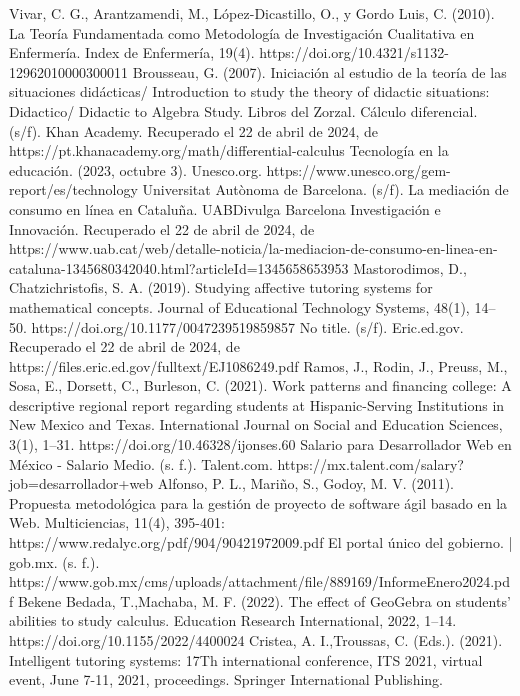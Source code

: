 \documentclass{article}
\begin{document}
\newpage
\begin{thebibliography}{99}
   Vivar, C. G., Arantzamendi, M., López-Dicastillo, O., y Gordo Luis, C. (2010). La Teoría Fundamentada como Metodología de Investigación Cualitativa en Enfermería. Index de Enfermería, 19(4). https://doi.org/10.4321/s1132-12962010000300011
   Brousseau, G. (2007). Iniciación al estudio de la teoría de las situaciones didácticas/ Introduction to study the theory of didactic situations: Didactico/ Didactic to Algebra Study. Libros del Zorzal.
  Cálculo diferencial. (s/f). Khan Academy. Recuperado el 22 de abril de 2024, de https://pt.khanacademy.org/math/differential-calculus
   Tecnología en la educación. (2023, octubre 3). Unesco.org. https://www.unesco.org/gem-report/es/technology
   Universitat Autònoma de Barcelona. (s/f). La mediación de consumo en línea en Cataluña. UABDivulga Barcelona Investigación e Innovación. Recuperado el 22 de abril de 2024, de https://www.uab.cat/web/detalle-noticia/la-mediacion-de-consumo-en-linea-en-cataluna-1345680342040.html?articleId=1345658653953
   Mastorodimos, D., Chatzichristofis, S. A. (2019). Studying affective tutoring systems for mathematical concepts. Journal of Educational Technology Systems, 48(1), 14–50. https://doi.org/10.1177/0047239519859857
   No title. (s/f). Eric.ed.gov. Recuperado el 22 de abril de 2024, de https://files.eric.ed.gov/fulltext/EJ1086249.pdf
   Ramos, J., Rodin, J., Preuss, M., Sosa, E., Dorsett, C., Burleson, C. (2021). Work patterns and financing college: A descriptive regional report regarding students at Hispanic-Serving Institutions in New Mexico and Texas. International Journal on Social and Education Sciences, 3(1), 1–31. https://doi.org/10.46328/ijonses.60
  Salario para Desarrollador Web en México - Salario Medio. (s. f.). Talent.com. https://mx.talent.com/salary?job=desarrollador+web
  Alfonso, P. L., Mariño, S., Godoy, M. V. (2011). Propuesta metodológica para la gestión de proyecto de software ágil basado en la Web. Multiciencias, 11(4), 395-401: https://www.redalyc.org/pdf/904/90421972009.pdf
  El portal único del gobierno. | gob.mx. (s. f.). https://www.gob.mx/cms/uploads/attachment/file/889169/InformeEnero2024.pdf
  Bekene Bedada, T.,Machaba, M. F. (2022). The effect of GeoGebra on students’ abilities to study calculus. Education Research International, 2022, 1–14. https://doi.org/10.1155/2022/4400024
  Cristea, A. I.,Troussas, C. (Eds.). (2021). Intelligent tutoring systems: 17Th international conference, ITS 2021, virtual event, June 7-11, 2021, proceedings. Springer International Publishing.

\end{thebibliography}
\end{document}
